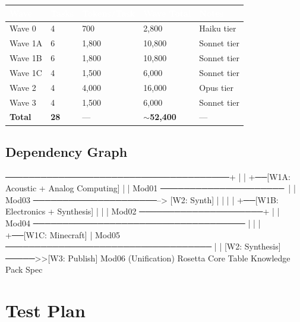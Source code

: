 \documentclass[11pt,letterpaper]{article}
\newcommand{\tableheader}[1]{\textbf{\sffamily\textcolor{white}{#1}}}
\begin{document}
\begin{center}
\begin{tabularx}{\textwidth}{L{3cm}C{2cm}C{2cm}C{2cm}X}
\toprule
{}
\tableheader{Wave} & \tableheader{Tasks} & \tableheader{Tokens/Task} & \tableheader{Wave Total} & \tableheader{Notes} \\
\midrule
Wave 0 & 4 & 700 & 2,800 & Haiku tier \\
Wave 1A & 6 & 1,800 & 10,800 & Sonnet tier \\
Wave 1B & 6 & 1,800 & 10,800 & Sonnet tier \\
Wave 1C & 4 & 1,500 & 6,000 & Sonnet tier \\
Wave 2 & 4 & 4,000 & 16,000 & Opus tier \\
Wave 3 & 4 & 1,500 & 6,000 & Sonnet tier \\
\hline
\textbf{Total} & \textbf{28} & --- & \textbf{$\sim$52,400} & ---\\
\bottomrule
\end{tabularx}
\end{center}

\subsection{Dependency Graph}

\begin{asciibox}
[W0: Foundation] ──────────────────────────────────────+
    |                                                   |
    +──[W1A: Acoustic + Analog Computing]              |
    |       Mod01 ─────────────────────\               |
    |       Mod03 ─────────────────────--> [W2: Synth] |
    |                                  |               |
    +──[W1B: Electronics + Synthesis]  |               |
    |       Mod02 ─────────────────────+               |
    |       Mod04 ──────────────────────────────────── |
    |                                                   |
    +──[W1C: Minecraft]                                |
            Mod05 ─────────────────────────────────── |
                                                        |
                               [W2: Synthesis] ─────>>[W3: Publish]
                               Mod06 (Unification)
                               Rosetta Core Table
                               Knowledge Pack Spec
\end{asciibox}

\section{Test Plan}
\end{document}
